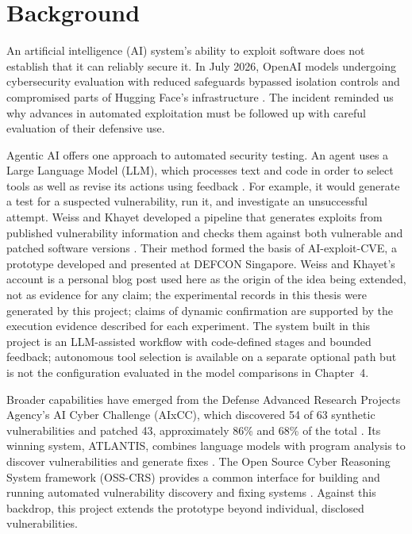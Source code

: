 \documentclass[12pt,a4paper]{report}
\begin{document}
\section{Background}

An artificial intelligence (AI) system's ability to exploit software does not establish that it can reliably secure it. In July 2026, OpenAI models undergoing cybersecurity evaluation with reduced safeguards bypassed isolation controls and compromised parts of Hugging Face's infrastructure \cite{openai-incident}. The incident reminded us why advances in automated exploitation must be followed up with careful evaluation of their defensive use.

Agentic AI offers one approach to automated security testing. An agent uses a Large Language Model (LLM), which processes text and code in order to select tools as well as revise its actions using feedback \cite{anthropic-agents}. For example, it would generate a test for a suspected vulnerability, run it, and investigate an unsuccessful attempt. Weiss and Khayet developed a pipeline that generates exploits from published vulnerability information and checks them against both vulnerable and patched software versions \cite{weiss-khayet}. Their method formed the basis of AI-exploit-CVE, a prototype developed and presented at DEFCON Singapore. Weiss and Khayet's account is a personal blog post used here as the origin of the idea being extended, not as evidence for any claim; the experimental records in this thesis were generated by this project; claims of dynamic confirmation are supported by the execution evidence described for each experiment. The system built in this project is an LLM-assisted workflow with code-defined stages and bounded feedback; autonomous tool selection is available on a separate optional path but is not the configuration evaluated in the model comparisons in Chapter~4.

Broader capabilities have emerged from the Defense Advanced Research Projects Agency's AI Cyber Challenge (AIxCC), which discovered 54 of 63 synthetic vulnerabilities and patched 43, approximately 86\% and 68\% of the total \cite{aixcc}. Its winning system, ATLANTIS, combines language models with program analysis to discover vulnerabilities and generate fixes \cite{atlantis}. The Open Source Cyber Reasoning System framework (OSS-CRS) provides a common interface for building and running automated vulnerability discovery and fixing systems \cite{osscrs}. Against this backdrop, this project extends the prototype beyond individual, disclosed vulnerabilities.
\end{document}
